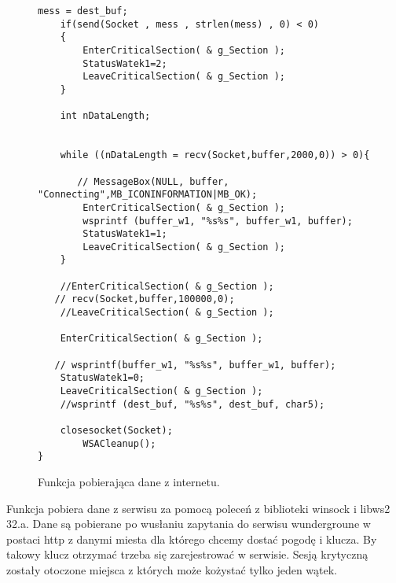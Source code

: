 \documentclass[a4paper,twoside,12pt]{mgr}
\begin{document}
\begin{figure}[H]
\centering
\begin{lstlisting}[frame=single] 	
	mess = dest_buf;
    if(send(Socket , mess , strlen(mess) , 0) < 0)
    {
        EnterCriticalSection( & g_Section );
	 	StatusWatek1=2;
	 	LeaveCriticalSection( & g_Section );
    }
	
    int nDataLength;
    
   
    while ((nDataLength = recv(Socket,buffer,2000,0)) > 0){        
        
       // MessageBox(NULL, buffer, "Connecting",MB_ICONINFORMATION|MB_OK);
        EnterCriticalSection( & g_Section );
        wsprintf (buffer_w1, "%s%s", buffer_w1, buffer);
	 	StatusWatek1=1;
	 	LeaveCriticalSection( & g_Section );
    }
    
    //EnterCriticalSection( & g_Section );
   // recv(Socket,buffer,100000,0);
    //LeaveCriticalSection( & g_Section );
    
    EnterCriticalSection( & g_Section );
  
   // wsprintf(buffer_w1, "%s%s", buffer_w1, buffer);
    StatusWatek1=0;
    LeaveCriticalSection( & g_Section );
    //wsprintf (dest_buf, "%s%s", dest_buf, char5);
    
    closesocket(Socket);
        WSACleanup();
}
\end{lstlisting}
\caption{Funkcja pobierająca dane z internetu.}%
\label{rys:etykieta}
\end{figure}
Funkcja pobiera dane z serwisu za pomocą poleceń z biblioteki winsock i libws2 32.a. Dane są pobierane po wusłaniu zapytania do serwisu wundergroune w postaci http z danymi miesta dla którego chcemy dostać pogodę i klucza. By takowy klucz otrzymać trzeba się zarejestrować w serwisie. Sesją krytyczną zostały otoczone miejsca z których może kożystać tylko jeden wątek.
\end{document}
